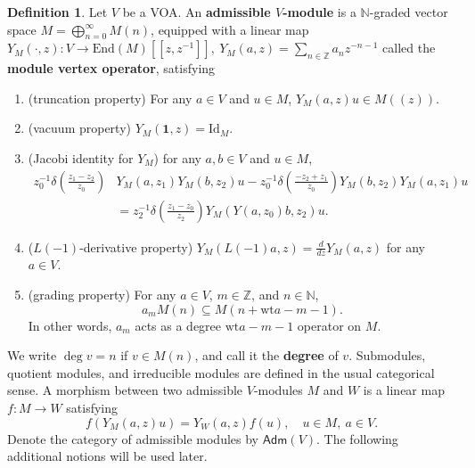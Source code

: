 \documentclass[12pt,a4paper,reqno]{amsart}
\numberwithin{equation}{section}
\numberwithin{equation}{section}
\theoremstyle{definition}
\newtheorem{df}[thm]{Definition}
\newcommand{\N}{\mathbb{N}}
\newcommand{\Z}{\mathbb{Z}}
\def \ra {\rightarrow}
\def \ssq{\subseteq}
\def \vac {\mathbf{1}}
\def \End {\mathrm{End}}
\def\Id{\mathrm{Id}}
\def \wt {\mathrm{wt}}
\begin{document}
\begin{df}\label{df:modulesoverVOA}
	Let $V$ be a VOA. An {\bf admissible $V$-module} is a $\N$-graded vector space $M=\bigoplus_{n=0}^\infty M(n)$, equipped with a linear map $Y_M(\cdot,z):V\ra \End(M)[\![z,z^{-1}]\!],\ Y_M(a,z)=\sum_{n\in \Z} a_nz^{-n-1}$ called the {\bf module vertex operator}, satisfying 
	\begin{enumerate}
		\item (truncation property) For any $a\in V$ and $u\in M$, $Y_M(a,z)u\in M((z))$. 
		\item (vacuum property) $Y_M(\vac,z)=\Id_M$. 
		\item (Jacobi identity for $Y_M$) for any $a,b\in V$ and $u\in M$, 	
		\begin{equation}\label{eq:formalJacobi}
			\begin{aligned}
				z_0^{-1}\delta\left(\frac{z_1-z_2}{z_0}\right) &Y_M(a,z_1)Y_M(b,z_2)u-z_0^{-1}\delta\left(\frac{-z_2+z_1}{z_0}\right)Y_M(b,z_2)Y_M(a,z_1)u\\
				&=z_2^{-1}\delta\left(\frac{z_1-z_0}{z_2}\right) Y_M(Y(a,z_0)b,z_2)u.
			\end{aligned} 
		\end{equation}
		
		\item ($L(-1)$-derivative property) $Y_M(L(-1)a,z)=\frac{d}{dz} Y_M(a,z)$ for any $a\in V$.
		\item (grading property) For any $a\in V$, $m\in \Z$, and $n\in \N$,  
		\begin{equation}\label{admcondition}
			a_mM(n)\ssq M(n+\wt a-m-1).
		\end{equation} 
		In other words, $a_m$ acts as a degree $\wt a-m-1$ operator on $M$. 
	\end{enumerate}
	We write $\deg v=n$ if $v\in M(n)$, and call it the {\bf degree} of $v$.  Submodules, quotient modules, and irreducible modules are defined in the usual categorical sense. A morphism between two admissible $V$-modules $M$ and $W$ is a linear map $f:M\ra W$ satisfying 
	\begin{equation}\label{eq:morphism}
		f(Y_M(a,z)u)=Y_W(a,z)f(u),\quad u\in M,\ a\in V.
	\end{equation}
	Denote the category of admissible modules by $\mathsf{Adm}(V)$. The following additional notions will be used later. 
	

\end{df}
\end{document}
